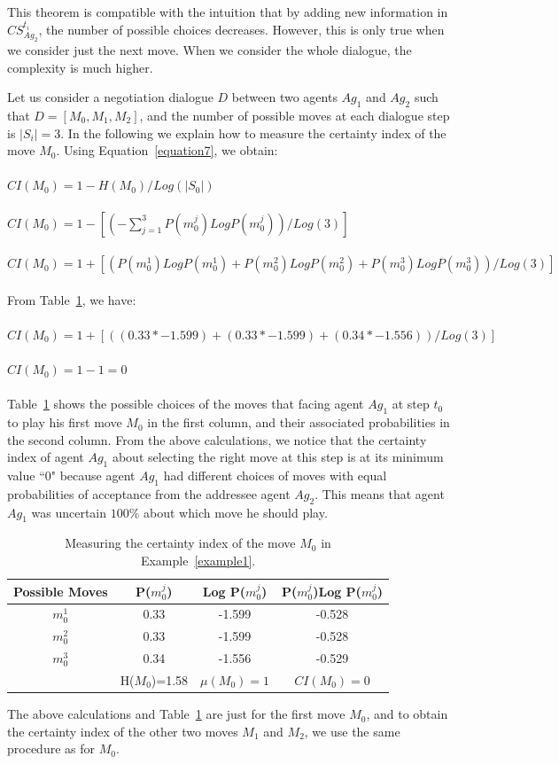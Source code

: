 This theorem is compatible with the intuition that by adding new information in $CS_{Ag_2}^{t_i}$, the number of possible choices
decreases. However, this is only true when we consider just the next move. When we consider the whole dialogue, the complexity is
much higher.

\begin{example}\label{example1}
Let us consider a negotiation dialogue $D$ between two agents $Ag_1$ and $Ag_2$ such that $D=[M_0, M_1, M_2]$, and the number of
possible moves at each dialogue step is $|S_i|=3$. In the following we explain how to measure the certainty index of the
move $M_0$. Using Equation~\ref{equation7}, we obtain:\\
\\$CI(M_0)= 1- H(M_0)/Log(|S_0|)$\\
\\$CI(M_0)= 1- [(-\sum_{j=1}^{3} P(m_0^j)Log P(m_0^j))/Log(3)]$\\
\\$CI(M_0)= 1+ [(P(m_0^1)Log P(m_0^1)+P(m_0^2)Log P(m_0^2)+P(m_0^3)Log P(m_0^3))/Log(3)]$\\
\\From Table~\ref{Table1}, we have: \\
\\$CI(M_0)= 1+ [((0.33* -1.599) + (0.33 *-1.599)+(0.34 * -1.556))/Log(3)]$\\
\\$CI(M_0)= 1- 1 = 0$\\\\
%
Table~\ref{Table1} shows the possible choices of the moves that facing agent $Ag_1$ at step $t_0$ to play his first move $M_0$ in
the first column, and their associated probabilities in the second column. From the above calculations, we notice that the certainty
index of agent $Ag_1$ about selecting the right move at this step is at its minimum value ``0" because agent $Ag_1$ had different
choices of moves with equal probabilities of acceptance from the addressee agent $Ag_2$. This means that agent $Ag_1$ was uncertain
$100 \%$ about which move he should play.


\begin{table}[tbp]
\centering \caption{Measuring the certainty index of the move
$M_0$ in Example~\ref{example1}.} \label{Table1}
\begin{tabular}{cccc}\hline
\textbf{Possible Moves}&{P($m_0^j$)}&\textbf{Log P($m_0^j$)}&\textbf{P($m_0^j$)Log P($m_0^j$)}\\
\hline
{$m_0^1$}&{0.33}&{-1.599}&{-0.528}\\
{$m_0^2$}&{0.33}&{-1.599}&{-0.528}\\
{$m_0^3$}&{0.34}&{-1.556}&{-0.529}\\
\hline
   & {H($M_0$)=1.58}&{$\mu(M_0)=1$} & {$CI(M_0)=0$} \\
   \hline
\end{tabular}
\end{table}
%
The above calculations and Table~\ref{Table1} are just for the first move $M_0$, and to obtain the certainty index of the other
two moves $M_1$ and $M_2$, we use the same procedure as for $M_0$.



\end{example}
